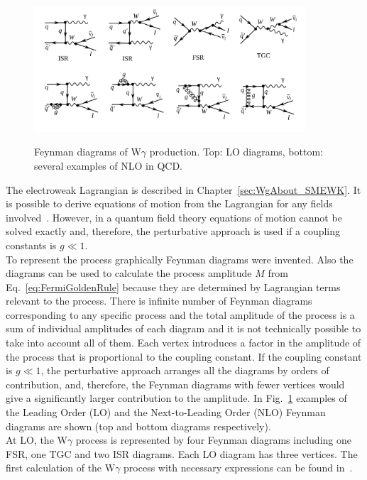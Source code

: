 \begin{figure}[htb]
  \begin{center}
    {\includegraphics[width=0.90\textwidth]{../figs/WgAbout/feynmWg_LO_NLO.png}}
    \caption{Feynman diagrams of W$\gamma$ production. Top: LO diagrams, bottom: several examples of NLO in QCD.}
    \label{fig:feynmWg_LO_NLO}
  \end{center}
\end{figure}

The electroweak Lagrangian is described in Chapter~\ref{sec:WgAbout_SMEWK}. It is possible to derive equations of motion from the Lagrangian for any fields involved~\cite{ref_Griffiths}. However, in a quantum field theory equations of motion cannot be solved exactly and, therefore, the perturbative approach is used if a coupling constants is $g \ll 1$.\\

To represent the process graphically Feynman diagrams were invented. Also the diagrams can be used to calculate the process amplitude $M$ from Eq.~\ref{eq:FermiGoldenRule} because they are determined by Lagrangian terms relevant to the process. There is infinite number of Feynman diagrams corresponding to any specific process and the total amplitude of the process is a sum of individual amplitudes of each diagram and it is not technically possible to take into account all of them. Each vertex introduces a factor in the amplitude of the process that is proportional to the coupling constant. If the coupling constant is $g \ll 1$, the perturbative approach arranges all the diagrams by orders of contribution, and, therefore, the Feynman diagrams with fewer vertices would give a significantly larger contribution to the amplitude. In Fig.~\ref{fig:feynmWg_LO_NLO} examples of the Leading Order (LO) and the Next-to-Leading Order (NLO) Feynman diagrams are shown (top and bottom diagrams respectively).\\

At LO, the W$\gamma$ process is represented by four Feynman diagrams including one FSR, one TGC and two ISR diagrams. Each LO diagram has three vertices. The first calculation of the W$\gamma$ process with necessary expressions can be found in~\cite{ref_theory_LO}.\\

